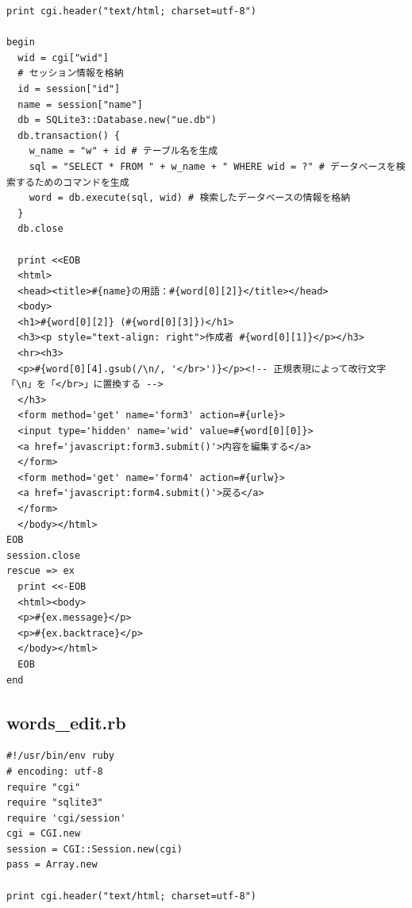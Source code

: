 \documentclass[12pt,a4paper]{jarticle}
\begin{document}
\begin{ttfamily}
\begin{oframed}
\begin{verbatim}
print cgi.header("text/html; charset=utf-8")

begin
  wid = cgi["wid"]
  # セッション情報を格納
  id = session["id"]
  name = session["name"]
  db = SQLite3::Database.new("ue.db")
  db.transaction() {
    w_name = "w" + id # テーブル名を生成
    sql = "SELECT * FROM " + w_name + " WHERE wid = ?" # データベースを検索するためのコマンドを生成
    word = db.execute(sql, wid) # 検索したデータベースの情報を格納
  }
  db.close

  print <<EOB
  <html>
  <head><title>#{name}の用語：#{word[0][2]}</title></head>
  <body>
  <h1>#{word[0][2]} (#{word[0][3]})</h1>
  <h3><p style="text-align: right">作成者 #{word[0][1]}</p></h3>
  <hr><h3>
  <p>#{word[0][4].gsub(/\n/, '</br>')}</p><!-- 正規表現によって改行文字「\n」を「</br>」に置換する -->
  </h3>
  <form method='get' name='form3' action=#{urle}>
  <input type='hidden' name='wid' value=#{word[0][0]}>
  <a href='javascript:form3.submit()'>内容を編集する</a>
  </form>
  <form method='get' name='form4' action=#{urlw}>
  <a href='javascript:form4.submit()'>戻る</a>
  </form>
  </body></html>
EOB
session.close
rescue => ex
  print <<-EOB
  <html><body>
  <p>#{ex.message}</p>
  <p>#{ex.backtrace}</p>
  </body></html>
  EOB
end
 \end{verbatim}
\end{oframed}

\subsection*{words\_edit.rb}
\begin{oframed}
 \fontsize{8pt}{8pt}\selectfont
 \begin{verbatim}
#!/usr/bin/env ruby
# encoding: utf-8
require "cgi"
require "sqlite3"
require 'cgi/session'
cgi = CGI.new
session = CGI::Session.new(cgi)
pass = Array.new

print cgi.header("text/html; charset=utf-8")


\end{verbatim}
\end{oframed}
\end{ttfamily}
\end{document}
